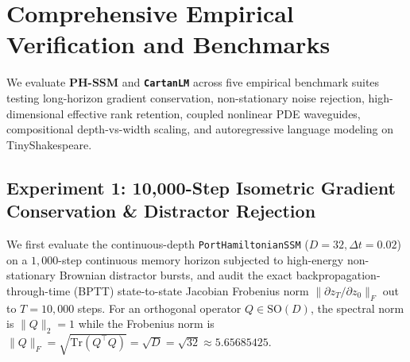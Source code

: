 \documentclass[11pt,a4paper]{article}
\begin{document}
\section{Comprehensive Empirical Verification and Benchmarks}
\label{sec:experiments}

We evaluate \textbf{PH-SSM} and \textbf{\texttt{CartanLM}} across five empirical benchmark suites testing long-horizon gradient conservation, non-stationary noise rejection, high-dimensional effective rank retention, coupled nonlinear PDE waveguides, compositional depth-vs-width scaling, and autoregressive language modeling on TinyShakespeare.

\subsection{Experiment 1: 10,000-Step Isometric Gradient Conservation \& Distractor Rejection}
We first evaluate the continuous-depth \texttt{PortHamiltonianSSM} ($D=32, \Delta t=0.02$) on a $1,000$-step continuous memory horizon subjected to high-energy non-stationary Brownian distractor bursts, and audit the exact backpropagation-through-time (BPTT) state-to-state Jacobian Frobenius norm $\|\partial z_T / \partial z_0\|_F$ out to $T = 10,000$ steps. For an orthogonal operator $Q \in \mathrm{SO}(D)$, the spectral norm is $\|Q\|_2 = 1$ while the Frobenius norm is $\|Q\|_F = \sqrt{\mathrm{Tr}(Q^\top Q)} = \sqrt{D} = \sqrt{32} \approx 5.65685425$.
\end{document}
